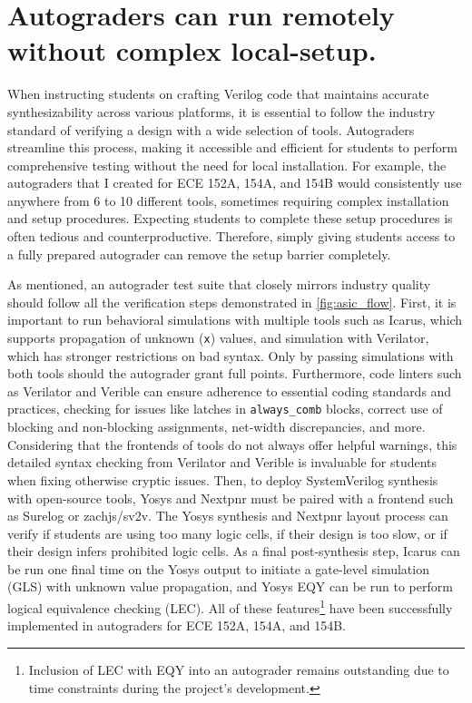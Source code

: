 \section{Autograders can run remotely without complex local-setup.}
\label{section:complex_tool_setups}

When instructing students on crafting Verilog code that maintains accurate synthesizability across various platforms, it is essential to follow the industry standard of verifying a design with a wide selection of tools. Autograders streamline this process, making it accessible and efficient for students to perform comprehensive testing without the need for local installation. For example, the autograders that I created for ECE 152A, 154A, and 154B would consistently use anywhere from 6 to 10 different tools, sometimes requiring complex installation and setup procedures. Expecting students to complete these setup procedures is often tedious and counterproductive. Therefore, simply giving students access to a fully prepared autograder can remove the setup barrier completely.

As mentioned, an autograder test suite that closely mirrors industry quality should follow all the verification steps demonstrated in \autoref{fig:asic_flow}. First, it is important to run behavioral simulations with multiple tools such as Icarus, which supports propagation of unknown (\texttt{x}) values, and simulation with Verilator, which has stronger restrictions on bad syntax. Only by passing simulations with both tools should the autograder grant full points. Furthermore, code linters such as Verilator and Verible can ensure adherence to essential coding standards and practices, checking for issues like latches in \texttt{always_comb} blocks, correct use of blocking and non-blocking assignments, net-width discrepancies, and more. Considering that the frontends of tools do not always offer helpful warnings, this detailed syntax checking from Verilator and Verible is invaluable for students when fixing otherwise cryptic issues. Then, to deploy SystemVerilog synthesis with open-source tools, Yosys and Nextpnr must be paired with a frontend such as Surelog or zachjs/sv2v. The Yosys synthesis and Nextpnr layout process can verify if students are using too many logic cells, if their design is too slow, or if their design infers prohibited logic cells. As a final post-synthesis step, Icarus can be run one final time on the Yosys output to initiate a gate-level simulation (GLS) with unknown value propagation, and Yosys EQY can be run to perform logical equivalence checking (LEC). All of these features\footnote{Inclusion of LEC with EQY into an autograder remains outstanding due to time constraints during the project's development.} have been successfully implemented in autograders for ECE 152A, 154A, and 154B.

